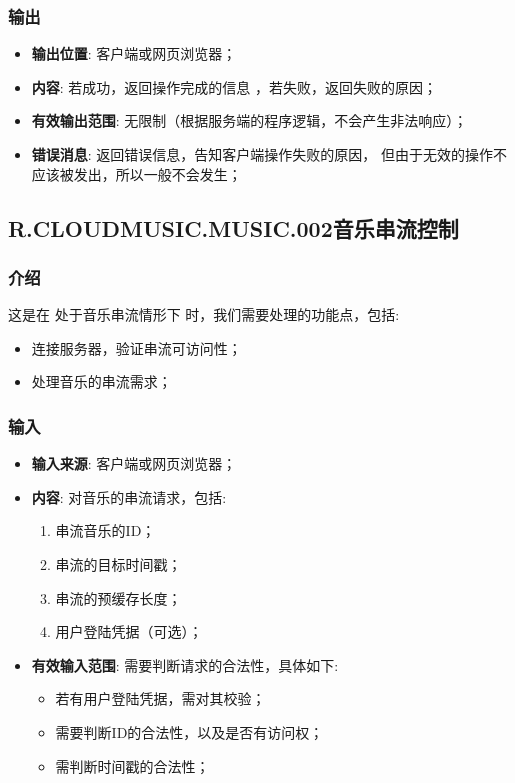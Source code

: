 \subsubsection{输出}
\begin{itemize}
	\item \textbf{输出位置}: 客户端或网页浏览器；
	\item \textbf{内容}: 若成功，返回操作完成的信息 ，若失败，返回失败的原因；
	\item \textbf{有效输出范围}: 无限制（根据服务端的程序逻辑，不会产生非法响应）；
	\item \textbf{错误消息}: 返回错误信息，告知客户端操作失败的原因，
		但由于无效的操作不应该被发出，所以一般不会发生；
\end{itemize}

\subsection{R.CLOUDMUSIC.MUSIC.002音乐串流控制}
\subsubsection{介绍}
	这是在 处于音乐串流情形下 时，我们需要处理的功能点，包括: 
	\begin{itemize}
		\item 连接服务器，验证串流可访问性；
		\item 处理音乐的串流需求；
	\end{itemize}
\subsubsection{输入}
	\begin{itemize}
		\item \textbf{输入来源}: 客户端或网页浏览器；
		\item \textbf{内容}: 对音乐的串流请求，包括: 
		\begin{enumerate}
			\item 串流音乐的ID；
			\item 串流的目标时间戳；
			\item 串流的预缓存长度；
			\item 用户登陆凭据（可选）；
		\end{enumerate}
		\item \textbf{有效输入范围}: 需要判断请求的合法性，具体如下: 
		\begin{itemize}
			\item 若有用户登陆凭据，需对其校验； 
			\item 需要判断ID的合法性，以及是否有访问权；
			\item 需判断时间戳的合法性； 
		\end{itemize}
	\end{itemize}
